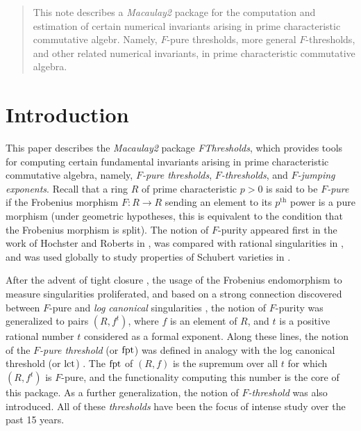 \documentclass{amsart}
\begin{document}
\begin{abstract}
	This note describes a \emph{Macaulay2} package for the computation and estimation of certain numerical invariants arising in prime characteristic commutative algebr.  Namely, $F$-pure thresholds, more general $F$-thresholds, and other related numerical invariants, in prime characteristic commutative algebra.  
\end{abstract}




\maketitle

\section{Introduction}

This paper describes the \emph{Macaulay2} package \emph{FThresholds}, which provides tools for computing certain fundamental invariants arising in prime characteristic commutative algebra, namely, \emph{$F$-pure thresholds}, \emph{$F$-thresholds}, and \emph{$F$-jumping exponents}.  Recall that a ring $R$ of prime characteristic $p>0$ is said to be \emph{$F$-pure} if the Frobenius morphism $F : R \to R$ sending an element to its $p^\text{th}$ power is a pure morphism (under geometric hypotheses, this is equivalent to the condition that the Frobenius morphism is split).  The notion of $F$-purity appeared first in the work of Hochster and Roberts in \cite{HochsterRobertsFrobeniusLocalCohomology}, was compared with rational singularities in \cite{FedderFPureRat}, and was used globally to study properties of Schubert varieties in \cite{MehtaRamanathanFrobeniusSplittingAndCohomologyVanishing}.  

After the advent of tight closure \cite{HochsterHunekeTC1}, the usage of the Frobenius endomorphism to measure singularities proliferated, and based on a strong connection discovered between $F$-pure and \emph{log canonical} singularities \cite{HaraWatanabeFRegFPure}, the notion of $F$-purity was generalized to pairs $(R, f^t)$, where $f$ is an element of $R$, and $t$ is a positive rational number $t$ considered as a formal exponent.  Along these lines, the notion of the \emph{$F$-pure threshold} (or $\operatorname{{fpt}}$) was defined in analogy with the log canonical threshold (or $\operatorname{{lct}}$) \cite{TakagiWatanabeFPureThresh,MustataTakagiWatanabeFThresholdsAndBernsteinSato}.  The $\operatorname{{fpt}}$ of $(R, f)$ is the supremum over all $t$ for which $(R, f^t)$ is $F$-pure, and the functionality computing this number is the core of this package.  As a further generalization, the notion of \emph{$F$-threshold} was also introduced.  All of these \emph{thresholds} have been the focus of intense study over the past 15 years.
\end{document}
